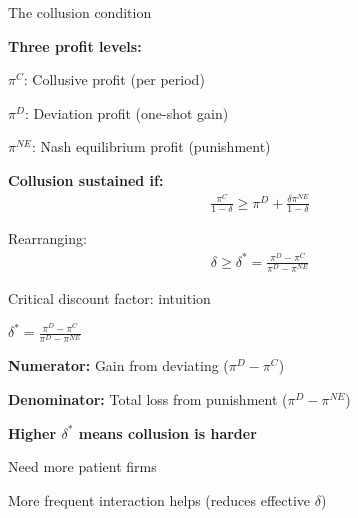 \documentclass[notes,11pt, aspectratio=169]{beamer}
\newenvironment{wideitemize}{\itemize\addtolength{\itemsep}{10pt}}{\enditemize}
\begin{document}
\begin{frame}{The collusion condition}
	\begin{wideitemize}
		\item \textbf{Three profit levels:}
		\begin{wideitemize}
			\vspace{5pt}
			\item $\pi^C$: Collusive profit (per period)
			\item $\pi^D$: Deviation profit (one-shot gain)
			\item $\pi^{NE}$: Nash equilibrium profit (punishment)
		\end{wideitemize}
		\item \textbf{Collusion sustained if:}
		\begin{align*}
			\frac{\pi^C}{1 - \delta} \geq \pi^D + \frac{\delta \pi^{NE}}{1 - \delta}
		\end{align*}
		\item Rearranging:
		\begin{align*}
			\delta \geq \delta^* = \frac{\pi^D - \pi^C}{\pi^D - \pi^{NE}}
		\end{align*}
	\end{wideitemize}
\end{frame}

\begin{frame}{Critical discount factor: intuition}
	\begin{wideitemize}
		\item $\delta^* = \frac{\pi^D - \pi^C}{\pi^D - \pi^{NE}}$
		\item \textbf{Numerator:} Gain from deviating ($\pi^D - \pi^C$)
		\item \textbf{Denominator:} Total loss from punishment ($\pi^D - \pi^{NE}$)
		\item \textbf{Higher $\delta^*$ means collusion is harder}
		\begin{wideitemize}
			\vspace{5pt}
			\item Need more patient firms
			\item More frequent interaction helps (reduces effective $\delta$)
		\end{wideitemize}
	\end{wideitemize}
\end{frame}
\end{document}
